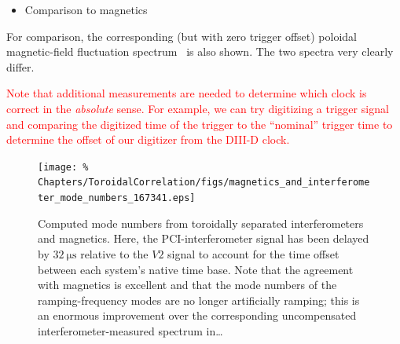 \begin{itemize}
  \item Comparison to magnetics
\end{itemize}

For comparison, the corresponding (but with zero trigger offset)
poloidal magnetic-field fluctuation spectrum~\cite{strait_rsi06}
is also shown.
The two spectra very clearly differ.

\textcolor{red}{Note that additional measurements are needed
to determine which clock is correct in the \emph{absolute} sense.
For example, we can try digitizing a trigger signal and
comparing the digitized time of the trigger to the ``nominal'' trigger time
to determine the offset of our digitizer from the DIII-D clock.}

\begin{figure}
  \centering
  \texttt{[image: \%
    Chapters/ToroidalCorrelation/figs/magnetics\_and\_interferometer\_mode\_numbers\_167341.eps]}
  \caption[Computed toroidal mode numbers \emph{after} removing time delay
      from \ldots  %
    ]{%
    Computed mode numbers from
    toroidally separated interferometers and magnetics.
    Here, the PCI-interferometer signal has been delayed by
    $\SI{32}{\micro\second}$ relative to the $V2$ signal
    to account for the time offset between each system's native time base.
    Note that the agreement with magnetics is excellent and that
    the mode numbers of the ramping-frequency modes are no longer
    artificially ramping;
    this is an enormous improvement over the corresponding
    uncompensated interferometer-measured spectrum in\ldots
  }
\label{fig:ToroidalCorrelation:compensated_time_delay}
\end{figure}


